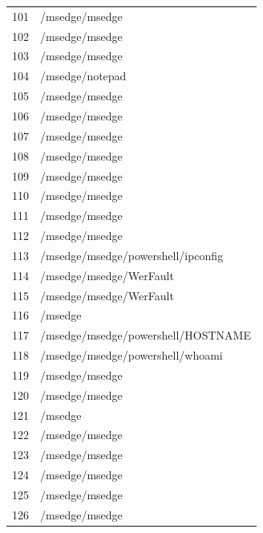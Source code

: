 \documentclass[a4paper,twoside,12pt]{book}
\begin{document}
\begin{appendices}
\begin{table}
\begin{tabular}{ll}
		101 &                                     /msedge/msedge \\
		102 &                                     /msedge/msedge \\
		103 &                                     /msedge/msedge \\
		104 &                                    /msedge/notepad \\
		105 &                                     /msedge/msedge \\
		106 &                                     /msedge/msedge \\
		107 &                                     /msedge/msedge \\
		108 &                                     /msedge/msedge \\
		109 &                                     /msedge/msedge \\
		110 &                                     /msedge/msedge \\
		111 &                                     /msedge/msedge \\
		112 &                                     /msedge/msedge \\
		113 &                 /msedge/msedge/powershell/ipconfig \\
		114 &                            /msedge/msedge/WerFault \\
		115 &                            /msedge/msedge/WerFault \\
		116 &                                            /msedge \\
		117 &                 /msedge/msedge/powershell/HOSTNAME \\
		118 &                   /msedge/msedge/powershell/whoami \\
		119 &                                     /msedge/msedge \\
		120 &                                     /msedge/msedge \\
		121 &                                            /msedge \\
		122 &                                     /msedge/msedge \\
		123 &                                     /msedge/msedge \\
		124 &                                     /msedge/msedge \\
		125 &                                     /msedge/msedge \\
		126 &                                     /msedge/msedge \\

\end{tabular}
\end{table}
\end{appendices}
\end{document}
